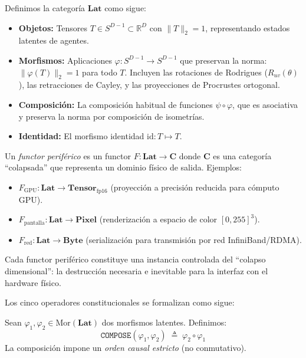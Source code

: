 \begin{definition}

Definimos la categoría $\mathbf{Lat}$ como sigue:
\begin{itemize}
    \item \textbf{Objetos:} Tensores $T \in S^{D-1} \subset \mathbb{R}^D$ 
    con $\|T\|_2 = 1$, representando estados latentes de agentes.
    \item \textbf{Morfismos:} Aplicaciones $\varphi: S^{D-1} \to S^{D-1}$ 
    que preservan la norma: $\|\varphi(T)\|_2 = 1$ para todo $T$. 
    Incluyen las rotaciones de Rodrigues ($R_{uv}(\theta)$), las 
    retracciones de Cayley, y las proyecciones de Procrustes ortogonal.
    \item \textbf{Composición:} La composición habitual de funciones 
    $\psi \circ \varphi$, que es asociativa y preserva la norma por 
    composición de isometrías.
    \item \textbf{Identidad:} El morfismo identidad $\text{id}: T \mapsto T$.
\end{itemize}
\end{definition}

\begin{definition}

Un \emph{functor periférico} es un functor $F: \mathbf{Lat} \to \mathbf{C}$
donde $\mathbf{C}$ es una categoría ``colapsada'' que representa un dominio
físico de salida. Ejemplos:
\begin{itemize}
    \item $F_{\text{GPU}}: \mathbf{Lat} \to \mathbf{Tensor}_{\text{fp16}}$ 
    (proyección a precisión reducida para cómputo GPU).
    \item $F_{\text{pantalla}}: \mathbf{Lat} \to \mathbf{Pixel}$ 
    (renderización a espacio de color $[0,255]^3$).
    \item $F_{\text{red}}: \mathbf{Lat} \to \mathbf{Byte}$ 
    (serialización para transmisión por red InfiniBand/RDMA).
\end{itemize}
Cada functor periférico constituye una instancia controlada del
``colapso dimensional'': la destrucción necesaria e inevitable para la 
interfaz con el hardware físico.
\end{definition}

Los cinco operadores constitucionales se formalizan como sigue:

\begin{definition}

Sean $\varphi_1, \varphi_2 \in \text{Mor}(\mathbf{Lat})$ dos morfismos
latentes. Definimos:
\begin{equation}
\texttt{COMPOSE}(\varphi_1, \varphi_2) \;\triangleq\; \varphi_2 \circ \varphi_1
\end{equation}
La composición impone un \emph{orden causal estricto} (no conmutativo).
\end{definition}

